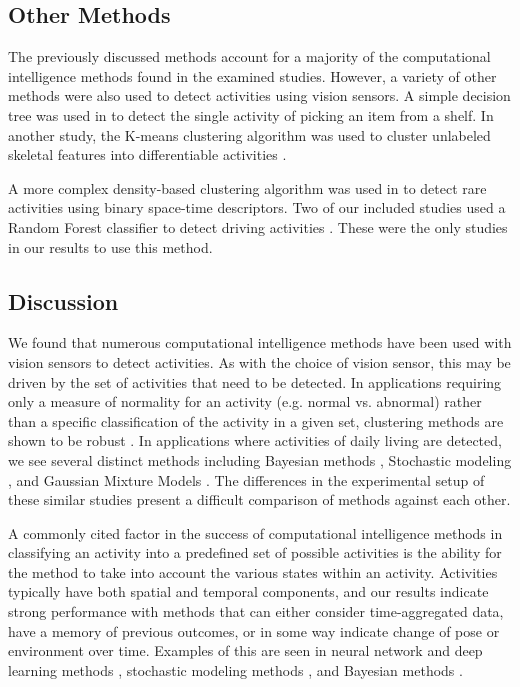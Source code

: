 \documentclass[12pt]{report}
\begin{document}
\subsection{Other Methods}

The previously discussed methods account for a majority of the computational intelligence methods found in the examined studies. However, a variety of other methods were also used to detect activities using vision sensors. A simple decision tree was used in \cite{Radhakrishnan2016} to detect the single activity of picking an item from a shelf. In another study, the K-means clustering algorithm was used to cluster unlabeled skeletal features into differentiable activities \cite{Ong2013}.

A more complex density-based clustering algorithm was used in \cite{Beleznai2012} to detect rare activities using binary space-time descriptors. Two of our included studies used a Random Forest classifier to detect driving activities \cite{Zhao2012, Martin2017}. These were the only studies in our results to use this method. 


\subsection{Discussion}
We found that numerous computational intelligence methods have been used with vision sensors to detect activities. As with the choice of vision sensor, this may be driven by the set of activities that need to be detected. In applications requiring only a measure of normality for an activity (e.g. normal vs. abnormal) rather than a specific classification of the activity in a given set, clustering methods are shown to be robust \cite{Beleznai2012}. In applications where activities of daily living are detected, we see several distinct methods including Bayesian methods \cite{Wu2007, McIlwraith2009}, Stochastic modeling \cite{Rowe2007, Figueroa-Angulo2013}, and Gaussian Mixture Models \cite{ElHelw2009, McIlwraith2008}. The differences in the experimental setup of these similar studies present a difficult comparison of methods against each other. 

A commonly cited factor in the success of computational intelligence methods in classifying an activity into a predefined set of possible activities is the ability for the method to take into account the various states within an activity. Activities typically have both spatial and temporal components, and our results indicate strong performance with methods that can either consider time-aggregated data, have a memory of previous outcomes, or in some way indicate change of pose or environment over time. Examples of this are seen in neural network and deep learning methods \cite{Savran2018, Li2016}, stochastic modeling methods \cite{Rowe2007, Figueroa-Angulo2013, Chakraborty2013, Lim2009}, and Bayesian methods \cite{Wu2007}.
\end{document}
